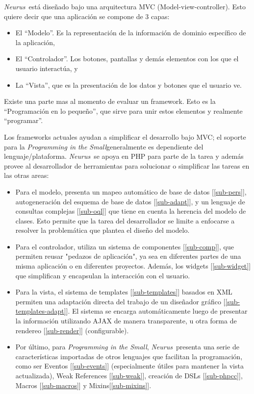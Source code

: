 \documentclass[a4paper,10pt]{article}
\newcommand{\PITS}{\emph{Programming in the Small}}
\newcommand{\PWB}{\emph{Neurus}}
\begin{document}
\PWB \ está diseñado bajo una arquitectura MVC (Model-view-controller).
Esto quiere decir que una aplicación se compone de 3 capas:
\begin{itemize}
\item El ``Modelo''. Es la representación de la información de dominio específico de la aplicación,
\item El ``Controlador''. Los botones, pantallas y demás elementos con los que el usuario interactúa, y
\item La ``Vista'', que es la presentación de los datos y botones que el usuario ve.
\end{itemize}

Existe una parte mas al momento de evaluar un framework. Esto es la ``Programación en lo pequeño'', que sirve para unir estos elementos y realmente ``programar''.

Los frameworks actuales ayudan a simplificar el desarrollo bajo MVC; el soporte para la \PITS generalmente es dependiente del lenguaje/plataforma. \PWB \ se apoya en PHP para parte de la tarea y además provee al desarrollador de herramientas para solucionar o simplificar las tareas en las otras areas:

\begin{itemize}
\item Para el modelo, presenta un mapeo automático de base de datos [\ref{sub-pers}], autogeneración del esquema de base de datos [\ref{sub-adapt}], y un lenguaje de consultas complejas [\ref{sub-oql}] que tiene en cuenta la herencia del modelo de clases.  Esto permite que la tarea del desarrollador se limite a enfocarse a resolver la problemática que plantea el diseño del modelo.

\item Para el controlador, utiliza un sistema de componentes [\ref{sub-comp}], que permiten reusar "pedazos de aplicación", ya sea en diferentes partes de una misma aplicación o en diferentes proyectos. Además, los widgets [\ref{sub-widget}] que simplifican y encapsulan la interacción con el usuario.

\item Para la vista, el sistema de templates [\ref{sub-templates}] basados en XML permiten una adaptación directa del trabajo de un diseñador gráfico [\ref{sub-templates-adapt}]. El sistema se encarga automáticamente luego de presentar la información utilizando AJAX de manera transparente, u otra forma de rendereo [\ref{sub-render}] (configurable).

\item Por último, para \PITS, \PWB \ presenta una serie de características importadas de otros lenguajes que facilitan la programación, como ser Eventos [\ref{sub-events}] (especialmente útiles para mantener la vista actualizada), Weak References [\ref{sub-weak}], creación de DSLs [\ref{sub-phpcc}], Macros [\ref{sub-macros}] y Mixins[\ref{sub-mixins}].
\end{itemize}
\end{document}
